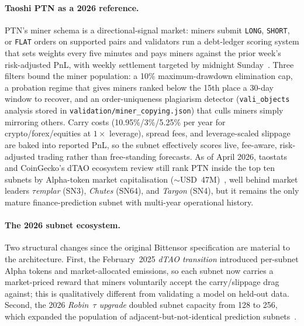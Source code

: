 \documentclass[11pt,a4paper]{article}
\begin{document}
\paragraph{Taoshi PTN as a 2026 reference.} PTN's miner schema is a directional-signal
market: miners submit \texttt{LONG}, \texttt{SHORT}, or \texttt{FLAT} orders on
supported pairs and validators run a debt-ledger scoring system that sets weights every
five minutes and pays miners against the prior week's risk-adjusted PnL, with weekly
settlement targeted by midnight Sunday~\cite{taoshi2024ptn}. Three filters bound the
miner population: a 10\% maximum-drawdown elimination cap, a probation regime that gives
miners ranked below the 15th place a 30-day window to recover, and an order-uniqueness
plagiarism detector (\texttt{vali\_objects} analysis stored in
\texttt{validation/miner\_copying.json}) that culls miners simply mirroring others.
Carry costs (10.95\%/3\%/5.25\% per year for crypto/forex/equities at $1\times$
leverage), spread fees, and leverage-scaled slippage are baked into reported PnL, so the
subnet effectively scores live, fee-aware, risk-adjusted trading rather than free-standing
forecasts. As of April 2026, taostats and CoinGecko's dTAO ecosystem review still rank
PTN inside the top ten subnets by Alpha-token market capitalisation
($\sim$USD~47M)~\cite{taoshi2024ptn}, well behind market leaders \textit{$\tau$emplar}
(SN3), \textit{Chutes} (SN64), and \textit{Targon} (SN4), but it remains the only mature
finance-prediction subnet with multi-year operational history.

\paragraph{The 2026 subnet ecosystem.} Two structural changes since the original
Bittensor specification are material to the architecture. First, the February~2025
\emph{dTAO transition} introduced per-subnet Alpha tokens and market-allocated
emissions, so each subnet now carries a market-priced reward that miners voluntarily
accept the carry/slippage drag against; this is qualitatively different from validating
a model on held-out data. Second, the 2026 \emph{Robin~$\tau$ upgrade} doubled subnet
capacity from 128 to 256, which expanded the population of adjacent-but-not-identical
prediction subnets~\cite{taoshi2024ptn}.
\end{document}
